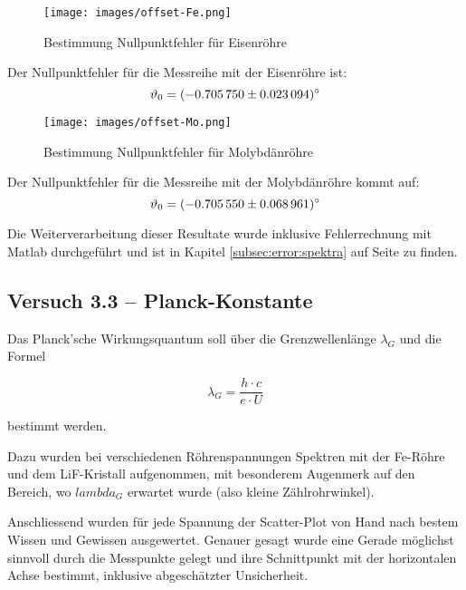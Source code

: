 \clearpage
\begin{figure}[h!]
    \centering
    \texttt{[image: images/offset-Fe.png]}
    \caption{Bestimmung Nullpunktfehler f\"ur Eisenr\"ohre}
    \label{fig:offset:fe}
\end{figure}

Der Nullpunktfehler f\"ur die Messreihe mit der Eisenr\"ohre ist:
$$\vartheta_0 = \SI{-0.70575 \pm 0.023094}{\degree}$$

\begin{figure}[h!]
    \centering
    \texttt{[image: images/offset-Mo.png]}
    \caption{Bestimmung Nullpunktfehler f\"ur Molybd\"anr\"ohre}
    \label{fig:offset:mo}
\end{figure}

Der Nullpunktfehler f\"ur die Messreihe mit der Molybd\"anr\"ohre kommt auf:
$$\vartheta_0 = \SI{-0.70555 \pm 0.068961}{\degree}$$

Die  Weiterverarbeitung dieser  Resultate wurde  inklusive Fehlerrechnung  mit
Matlab durchgef\"uhrt und ist  in Kapitel \ref{subsec:error:spektra} auf Seite
\pageref{subsec:error:spektra} zu finden.


\subsection{Versuch 3.3 -- Planck-Konstante}
\label{subsec:planck}

Das Planck'sche Wirkungsquantum soll \"uber die Grenzwellenl\"ange $\lambda_G$ und
die Formel

\begin{equation*}
    \lambda_G = \frac{h \cdot c}{e \cdot U}
\end{equation*}

bestimmt werden.

Dazu wurden  bei verschiedenen R\"ohrenspannungen Spektren  mit der Fe-R\"ohre
und dem LiF-Kristall aufgenommen, mit besonderem Augenmerk auf den Bereich, wo
$lambda_G$ erwartet wurde (also kleine Z\"ahlrohrwinkel).

Anschliessend  wurden  f\"ur jede  Spannung  der  Scatter-Plot von  Hand  nach
bestem  Wissen  und Gewissen  ausgewertet. Genauer  gesagt  wurde eine  Gerade
m\"oglichst sinnvoll durch die Messpunkte gelegt und ihre Schnittpunkt mit der
horizontalen Achse bestimmt, inklusive abgesch\"atzter Unsicherheit.

